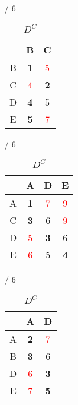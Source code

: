 \documentclass[a4paper, 11 pt, article, accentcolor=tud7b]{tudreport}
\begin{document}
	\begin{table}[h]
	  \begin{subtable}[b]{\textwidth / 6}
	    \begin{tabular}{| c | c | c |}
	      \hline
	        & B                   & C                  \\ \hline
	      B & \textbf{1}          & \textcolor{red}{5} \\ \hline
	      C & \textcolor{red}{4}  & \textbf{2}         \\ \hline
	      D & \textbf{4}          & 5                  \\ \hline
	      E & \textbf{5}          & \textcolor{red}{7} \\ \hline
	    \end{tabular}
	    \caption{$D^{A}$}
	  \end{subtable}
	  \hfill
	  \begin{subtable}[b]{\textwidth / 6}
	    \begin{tabular}{| c | c | c | c |}
	    \hline
	      & A                   & D                  & E                  \\ \hline
	    A & \textbf{1}          & \textcolor{red}{7} & \textcolor{red}{9} \\ \hline
	    C & \textbf{3}          & 6                  & \textcolor{red}{9} \\ \hline
	    D & \textcolor{red}{5}  & \textbf{3}         & 6                  \\ \hline
	    E & \textcolor{red}{6}  & 5                  & \textbf{4}         \\ \hline
	    \end{tabular}
	    \caption{$D^{B}$}
	  \end{subtable}
	  \hfill
	  \begin{subtable}[b]{\textwidth / 6}
	    \begin{tabular}{| c | c | c |}
	    \hline
	      & A                   & D                  \\ \hline
	    A & \textbf{2}          & \textcolor{red}{7} \\ \hline
	    B & \textbf{3}          & 6                  \\ \hline
	    D & \textcolor{red}{6}  & \textbf{3}         \\ \hline
	    E & \textcolor{red}{7}  & \textbf{5}         \\ \hline
	    \end{tabular}
	    \caption{$D^{C}$}
	  \end{subtable}

\end{table}
\end{document}
